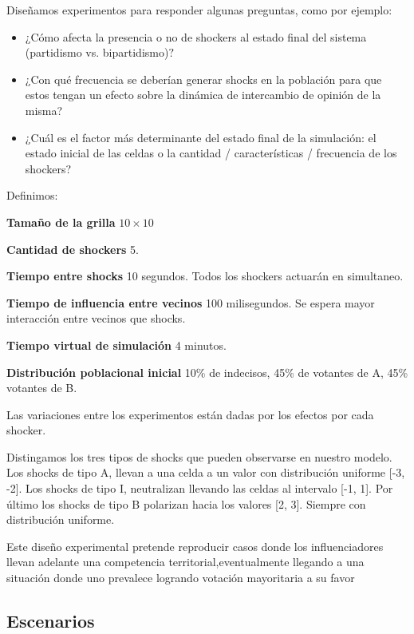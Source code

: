 Diseñamos experimentos para responder algunas preguntas, como por ejemplo:
\begin{itemize}
\item ¿Cómo afecta la presencia o no de shockers al estado final del sistema (partidismo vs. bipartidismo)$?$ 
\item ¿Con qué frecuencia se deberían generar shocks en la población para que estos tengan un efecto sobre la dinámica de intercambio de opinión de la misma?
\item ¿Cuál es el factor más determinante del estado final de la simulación: el estado inicial de las celdas o la cantidad / características / frecuencia de los shockers?
\end{itemize}

Definimos:

\begin{description}
    \item \textbf{Tamaño de la grilla}  $10 \times 10$
    \item \textbf{Cantidad de shockers} 5.
    \item \textbf{Tiempo entre shocks} 10 segundos. Todos los shockers actuarán en simultaneo.
    \item \textbf{Tiempo de influencia entre vecinos} 100 milisegundos. Se espera mayor interacción entre vecinos que shocks.
    \item \textbf{Tiempo virtual de simulación} 4 minutos.
    \item \textbf{Distribución poblacional inicial} 10\% de indecisos, 45\% de votantes de A, 45\% votantes de B.
\end{description}

Las variaciones entre los experimentos están dadas por los efectos por cada shocker.

Distingamos los tres tipos de shocks que pueden observarse en nuestro modelo.
Los shocks de tipo A, llevan a una celda a un valor con distribución
uniforme [-3, -2]. Los shocks de tipo I, neutralizan
llevando las celdas al intervalo  [-1, 1]. Por último los shocks de tipo B
polarizan hacia los valores [2, 3]. Siempre con distribución uniforme.

Este diseño experimental pretende reproducir casos donde los influenciadores
llevan adelante una competencia territorial,eventualmente llegando a una
situación donde uno prevalece logrando votación mayoritaria a su favor

\subsection{Escenarios} %
\label{sub:Escenarios}

